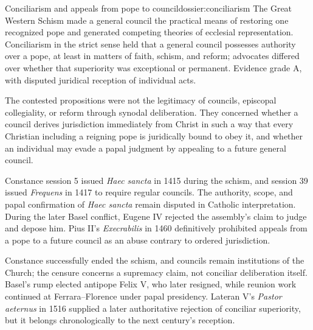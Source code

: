 \begin{heresydossier}{Conciliarism and appeals from pope to council}{dossier:conciliarism}
\objectfield The Great Western Schism made a general council the practical means of restoring one recognized pope and generated competing theories of ecclesial representation. Conciliarism in the strict sense held that a general council possesses authority over a pope, at least in matters of faith, schism, and reform; advocates differed over whether that superiority was exceptional or permanent. Evidence grade A, with disputed juridical reception of individual acts.

\propositionfield The contested propositions were not the legitimacy of councils, episcopal collegiality, or reform through synodal deliberation. They concerned whether a council derives jurisdiction immediately from Christ in such a way that every Christian including a reigning pope is juridically bound to obey it, and whether an individual may evade a papal judgment by appealing to a future general council.

\responsefield Constance session 5 issued \emph{Haec sancta} in 1415 during the schism, and session 39 issued \emph{Frequens} in 1417 to require regular councils. The authority, scope, and papal confirmation of \emph{Haec sancta} remain disputed in Catholic interpretation. During the later Basel conflict, Eugene IV rejected the assembly's claim to judge and depose him. Pius II's \emph{Execrabilis} in 1460 definitively prohibited appeals from a pope to a future council as an abuse contrary to ordered jurisdiction.

\aftermathfield Constance successfully ended the schism, and councils remain institutions of the Church; the censure concerns a supremacy claim, not conciliar deliberation itself. Basel's rump elected antipope Felix V, who later resigned, while reunion work continued at Ferrara--Florence under papal presidency. Lateran V's \emph{Pastor aeternus} in 1516 supplied a later authoritative rejection of conciliar superiority, but it belongs chronologically to the next century's reception.
\end{heresydossier}

